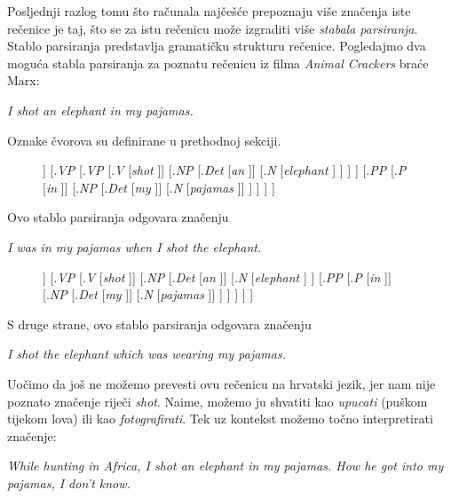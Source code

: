 \documentclass[a4paper,twoside,12pt]{memoir} %
\newcommand{\ti}[1]{\textit{#1\/}}
\begin{document}
	\bigskip

	Posljednji razlog tomu što računala najčešće prepoznaju više značenja iste rečenice je taj, što se za istu rečenicu može izgraditi više \ti{stabala parsiranja}. Stablo parsiranja predstavlja gramatičku strukturu rečenice. Pogledajmo dva moguća stabla parsiranja za poznatu rečenicu iz filma \ti{Animal Crackers} braće Marx:
	\begin{displayquote}
		\ti{I shot an elephant in my pajamas.}
	\end{displayquote}
	Oznake čvorova su definirane u prethodnoj sekciji.

	\begin{figure}[H]
		\Tree
		[.\ti{S}
		[.\ti{NP} [\ti{I} ]]
		[.\ti{VP}
		[.\ti{VP}
		[.\ti{V} [\ti{shot} ]]
		[.\ti{NP}
		[.\ti{Det} [\ti{an} ]]
		[.\ti{N} [\ti{elephant} ] ]
		]
		]
		[.\ti{PP}
		[.\ti{P} [\ti{in} ]]
		[.\ti{NP}
		[.\ti{Det} [\ti{my} ]]
		[.\ti{N} [\ti{pajamas} ]]
		]
		]
		]
		]
	\end{figure}

	\noindent
	Ovo stablo parsiranja odgovara značenju
	\begin{displayquote}
		\ti{I was in my pajamas when I shot the elephant.}
	\end{displayquote}
	\newpage

	\begin{figure}[H]
		\Tree
		[.\ti{S}
		[.\ti{NP} [\ti{I} ]]
		[.\ti{VP}
		[.\ti{V} [\ti{shot} ]]
		[.\ti{NP}
		[.\ti{Det} [\ti{an} ]]
		[.\ti{N} [\ti{elephant} ] ]
		[.\ti{PP}
		[.\ti{P} [\ti{in} ]]
		[.\ti{NP}
		[.\ti{Det} [\ti{my} ]]
		[.\ti{N} [\ti{pajamas} ]]
		]
		]
		]
		]
		]
	\end{figure}

	\noindent
	S druge strane, ovo stablo parsiranja odgovara značenju
	\begin{displayquote}
		\ti{I shot the elephant which was wearing my pajamas.}
	\end{displayquote}

	\bigskip

	Uočimo da još ne možemo prevesti ovu rečenicu na hrvatski jezik, jer nam nije poznato značenje riječi \ti{shot}. Naime, možemo ju shvatiti kao \ti{upucati} (puškom tijekom lova) ili kao \ti{fotografirati}. Tek uz kontekst možemo točno interpretirati značenje:
	\begin{displayquote}
		\ti{While hunting in Africa, I shot an elephant in my pajamas. How he got into my pajamas, I don't know.}
	\end{displayquote}
\end{document}
